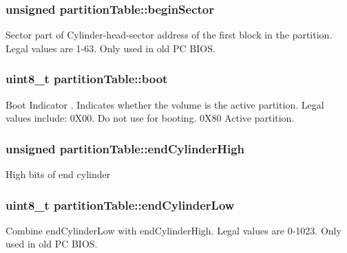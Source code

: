 \subsubsection[{begin\+Sector}]{\setlength{\rightskip}{0pt plus 5cm}unsigned partition\+Table\+::begin\+Sector}\label{structpartition_table_ae201c11d9671c9efc307c654a2b6c026}
Sector part of Cylinder-\/head-\/sector address of the first block in the partition. Legal values are 1-\/63. Only used in old P\+C B\+I\+O\+S. \hypertarget{structpartition_table_adf386afb1f33046d8b6a1a0afa780ec9}{}
\subsubsection[{boot}]{\setlength{\rightskip}{0pt plus 5cm}uint8\+\_\+t partition\+Table\+::boot}\label{structpartition_table_adf386afb1f33046d8b6a1a0afa780ec9}
Boot Indicator . Indicates whether the volume is the active partition. Legal values include\+: 0\+X00. Do not use for booting. 0\+X80 Active partition. \hypertarget{structpartition_table_a32fea225b8ffd925ad919ffc56e9abda}{}
\subsubsection[{end\+Cylinder\+High}]{\setlength{\rightskip}{0pt plus 5cm}unsigned partition\+Table\+::end\+Cylinder\+High}\label{structpartition_table_a32fea225b8ffd925ad919ffc56e9abda}
High bits of end cylinder \hypertarget{structpartition_table_ad7829e34be70084abe145227b0d18274}{}
\subsubsection[{end\+Cylinder\+Low}]{\setlength{\rightskip}{0pt plus 5cm}uint8\+\_\+t partition\+Table\+::end\+Cylinder\+Low}\label{structpartition_table_ad7829e34be70084abe145227b0d18274}
Combine end\+Cylinder\+Low with end\+Cylinder\+High. Legal values are 0-\/1023. Only used in old P\+C B\+I\+O\+S. \hypertarget{structpartition_table_a4a3945bfd3a29f474984cb9f180dbd51}{}
